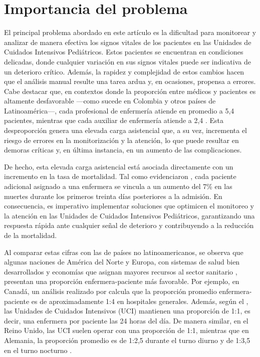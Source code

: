 \medskip

\section{Importancia del problema}


El principal problema abordado en este artículo es la dificultad para monitorear y analizar de manera efectiva los signos vitales de los pacientes en las Unidades de Cuidados Intensivos Pediátricos. Estos pacientes se encuentran en condiciones delicadas, donde cualquier variación en sus signos vitales puede ser indicativa de un deterioro crítico. Además, la rapidez y complejidad de estos cambios hacen que el análisis manual resulte una tarea ardua y, en ocasiones, propensa a errores. Cabe destacar que, en contextos donde la proporción entre médicos y pacientes es altamente desfavorable —como sucede en Colombia y otros países de Latinoamérica—, cada profesional de enfermería atiende en promedio a 5,4 pacientes, mientras que cada auxiliar de enfermería atiende a 2,4 \parencite{Arango2015}. Esta desproporción genera una elevada carga asistencial que, a su vez, incrementa el riesgo de errores en la monitorización y la atención, lo que puede resultar en demoras críticas y, en última instancia, en un aumento de las complicaciones.

De hecho, esta elevada carga asistencial está asociada directamente con un incremento en la tasa de mortalidad. Tal como evidenciaron \textcite{Aiken2002}, cada paciente adicional asignado a una enfermera se vincula a un aumento del 7\% en las muertes durante los primeros treinta días posteriores a la admisión. En consecuencia, es imperativo implementar soluciones que optimicen el monitoreo y la atención en las Unidades de Cuidados Intensivos Pediátricos, garantizando una respuesta rápida ante cualquier señal de deterioro y contribuyendo a la reducción de la mortalidad.

Al comparar estas cifras con las de países no latinoamericanos, se observa que algunas naciones de América del Norte y Europa, con sistemas de salud bien desarrollados y economías que asignan mayores recursos al sector sanitario \parencite{oecd2024society}, presentan una proporción enfermera-paciente más favorable. Por ejemplo, en Canadá, un análisis realizado por \textcite{Ariste2019} calcula que la proporción promedio enfermera-paciente es de aproximadamente 1:4 en hospitales generales. Además, según el \textcite{MinistryHealth2024}, las Unidades de Cuidados Intensivos (UCI) mantienen una proporción de 1:1, es decir, una enfermera por paciente las 24 horas del día. De manera similar, en el Reino Unido, las UCI suelen operar con una proporción de 1:1, mientras que en Alemania, la proporción promedio es de 1:2,5 durante el turno diurno y de 1:3,5 en el turno nocturno \parencite{Depasse1998}. 

